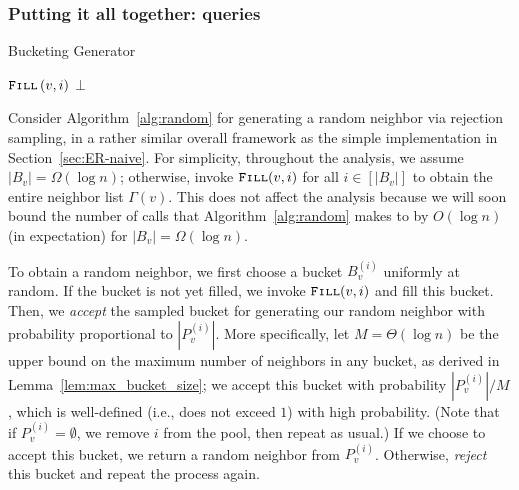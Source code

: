 \subsubsection{Putting it all together:  queries}
\label{sec:random_neighbor}

      \begin{algorithm}[H]
        \caption{Bucketing Generator}
        \begin{algorithmic}
    \Repeat
            \State$\texttt{\textsc{Fill}}\left( v,i\right)$
        \EndIf
        \Else
        \EndIf
    \State \Return $\bot$
\EndProcedure
        \end{algorithmic}
\label{alg:random}
      \end{algorithm}

Consider Algorithm~\ref{alg:random} for generating a random neighbor via rejection sampling, in a rather similar overall framework as the simple implementation in Section~\ref{sec:ER-naive}.
For simplicity, throughout the analysis, we assume $|B_v| = \Omega(\log n)$; otherwise, invoke $\texttt{\textsc{Fill}}(v,i)$ for all $i \in [|B_v|]$ to obtain the entire neighbor list $\Gamma(v)$. This does not affect the analysis because we will soon bound the number of calls that Algorithm~\ref{alg:random} makes to  by $O(\log n)$ (in expectation) for $|B_v| = \Omega(\log n)$.

To obtain a random neighbor, we first choose a bucket $B_v^{(i)}$ uniformly at random.
If the bucket is not yet filled, we invoke $\texttt{\textsc{Fill}}(v,i)$ and fill this bucket.
Then, we \emph{accept} the sampled bucket for generating our random neighbor with probability proportional to $|P_v^{(i)}|$. More specifically, let $M = \Theta(\log n)$ be the upper bound on the maximum number of neighbors in any bucket, as derived in Lemma~\ref{lem:max_bucket_size}; we accept this bucket with probability $|P_v^{(i)}|/M$, which is well-defined (i.e., does not exceed $1$) with high probability. 
(Note that if $P_v^{(i)} = \emptyset$, we remove $i$ from the pool, then repeat as usual.) 
If we choose to accept this bucket, we return a random neighbor from $P_v^{(i)}$.
Otherwise, \emph{reject} this bucket and repeat the process again.

